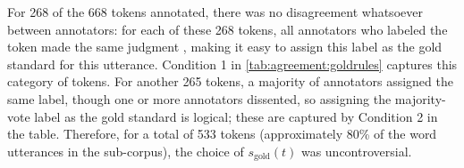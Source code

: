 				
		
		
		
		For 268 of the 
		668 tokens annotated, there was no disagreement whatsoever between annotators: for each of these 268 tokens, all annotators who labeled the token made the same judgment , making it easy to assign this label as the gold standard for this utterance. Condition 1 in \cref{tab:agreement:goldrules} captures this category of tokens. 
		For another 265 tokens, a majority of annotators assigned the same label, though one or more annotators dissented, so assigning the majority-vote label as the gold standard is logical; these are captured by Condition 2  in the table. Therefore, for a total of 533 tokens (approximately 80\% of the word utterances in the sub-corpus), the choice of $s_{\text{gold}}(t)$ was uncontroversial.
		
